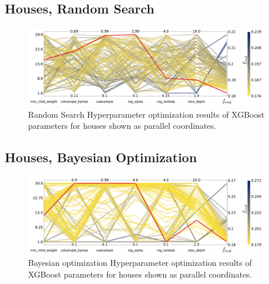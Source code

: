 \clearpage
\FloatBarrier
\subsection*{Houses, Random Search}
\begin{figure}[h!]
  \includegraphics[width=0.95\textwidth, trim=0 0 0 0, clip]{figures/housing/Villa_v19_cut_all_Ncols_all_CV_viz_HPO_RS.pdf}
  \caption[Parallel Coordinate Plot of the Hyperparameter Optimization for Houses Using Random Search]
          {Random Search Hyperparameter optimization results of XGBoost parameters for houses shown as parallel coordinates.} 
  \label{fig:h:CV_res_RS_parallel_coords_villa}
\end{figure}
\vspace{3cm}
\FloatBarrier
\subsection*{Houses, Bayesian Optimization}
\begin{figure}[h!]
  \includegraphics[width=0.95\textwidth, trim=0 0 0 0, clip]{figures/housing/Villa_v19_cut_all_Ncols_all_CV_viz_HPO_BO.pdf}
  \caption[Parallel Coordinate Plot of the Hyperparameter Optimization for Houses Using Bayesian Optimization]
          {Bayesian optimization Hyperparameter optimization results of XGBoost parameters for houses shown as parallel coordinates.}
  \label{fig:h:CV_res_BO_parallel_coords_villa}
\end{figure}
\clearpage


